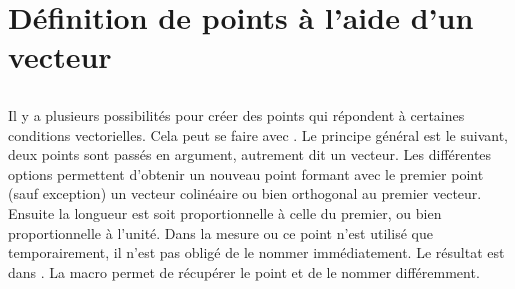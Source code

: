 

\section{Définition de points à l'aide d'un vecteur}

\subsection{}
Il y a plusieurs possibilités pour créer des points qui répondent à certaines conditions vectorielles.
Cela peut se faire avec  . Le principe général est le suivant, deux points sont passés en argument, autrement dit un vecteur. Les différentes options permettent d'obtenir  un nouveau point formant avec le premier point (sauf exception) un vecteur colinéaire  ou bien orthogonal au premier vecteur. Ensuite la longueur est soit proportionnelle à celle du premier, ou bien proportionnelle à l'unité. Dans la mesure ou ce point n'est utilisé que temporairement, il n'est pas obligé de le nommer immédiatement. Le résultat est dans . La macro  permet de récupérer le point et de le nommer différemment.

